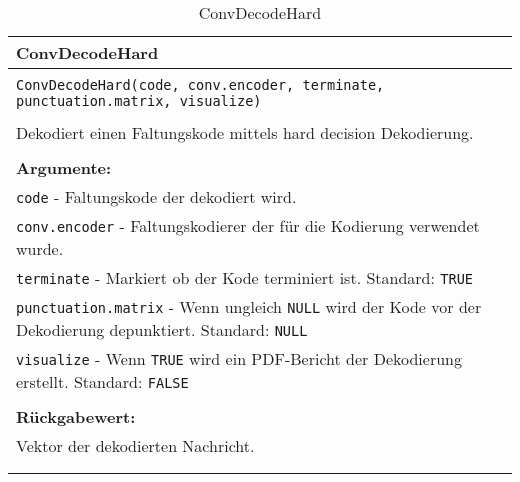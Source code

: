 \begin{longtable}{|p{\textwidth}|}
\hline
\rowcolor{lightblue}
ConvDecodeHard
\\
\hline
\\
\texttt{ConvDecodeHard(code, conv.encoder, terminate, punctuation.matrix, visualize)}\\
\\
Dekodiert einen Faltungskode mittels hard decision Dekodierung.\\
\\
\textbf{Argumente:}\\
\texttt{code} - Faltungskode der dekodiert wird.\\
\texttt{conv.encoder} - Faltungskodierer der für die Kodierung verwendet wurde.\\
\texttt{terminate} - Markiert ob der Kode terminiert ist. Standard: \texttt{TRUE}\\
\texttt{punctuation.matrix} - Wenn ungleich \texttt{NULL} wird der Kode vor der Dekodierung depunktiert. Standard: \texttt{NULL}\\
\texttt{visualize} - Wenn \texttt{TRUE} wird ein PDF-Bericht der Dekodierung erstellt. Standard: \texttt{FALSE}\\
\\
\textbf{Rückgabewert:}\\
Vektor der dekodierten Nachricht.\\
\\
\hline
\caption{ConvDecodeHard}
\end{longtable}